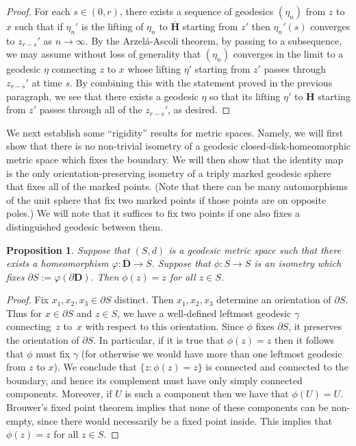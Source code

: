 \documentclass[10pt]{amsart}
\theoremstyle{plain}
\numberwithin{theorem}{section}
\newtheorem{proposition}[theorem]{Proposition}
\theoremstyle{definition}
\newcommand{\D}{\mathbf{D}}
\newcommand{\h}{\mathbf{H}}
\let\ol\overline
\begin{document}
\begin{proof}
For each $s \in (0,r)$, there exists a sequence of geodesics $(\eta_n)$ from $z$ to $x$ such that if $\eta_n'$ is the lifting of $\eta_n$ to $\ol{\h}$ starting from $z'$ then $\eta_n'(s)$ converges to $z_{r-s}'$ as $n \to \infty$. By the Arzelá-Ascoli theorem, by passing to a subsequence, we may assume without loss of generality that $(\eta_n)$ converges in the limit to a geodesic $\eta$ connecting $z$ to $x$ whose lifting $\eta'$ starting from $z'$ passes through $z_{r-s}'$ at time $s$. By combining this with the statement proved in the previous paragraph, we see that there exists a geodesic $\eta$ so that its lifting $\eta'$ to $\ol{\h}$ starting from $z'$ passes through all of the $z_{r-s}'$, as desired.
\end{proof}

We next establish some ``rigidity'' results for metric spaces. Namely, we will first show that there is no non-trivial isometry of a geodesic closed-disk-homeomorphic metric space which fixes the boundary. We will then show that the identity map is the only orientation-preserving isometry of a triply marked geodesic sphere that fixes all of the marked points. (Note that there can be many automorphisms of the unit sphere that fix two marked points if those points are on opposite poles.) We will note that it suffices to fix two points if one also fixes a distinguished geodesic between them.

\begin{proposition}
\label{prop::boundaryfixesisometry}
Suppose that $(S,d)$ is a geodesic metric space such that there exists a homeomorphism $\varphi \colon \ol{\D} \to S$. Suppose that $\phi \colon S \to S$ is an isometry which fixes $\partial S := \varphi(\partial \D)$. Then $\phi(z) = z$ for all $z \in S$.
\end{proposition}
\begin{proof}
Fix $x_1,x_2,x_3 \in \partial S$ distinct. Then $x_1,x_2,x_3$ determine an orientation of $\partial S$. Thus for $x \in \partial S$ and $z \in S$, we have a well-defined leftmost geodesic $\gamma$ connecting~$z$ to~$x$ with respect to this orientation. Since $\phi$ fixes $\partial S$, it preserves the orientation of $\partial S$. In particular, if it is true that $\phi(z) = z$ then it follows that $\phi$ must fix $\gamma$ (for otherwise we would have more than one leftmost geodesic from $z$ to $x$). We conclude that $\{z : \phi(z) = z\}$ is connected and connected to the boundary, and hence its complement must have only simply connected components. Moreover, if $U$ is such a component then we have that $\phi(U) = U$. Brouwer's fixed point theorem implies that none of these components can be non-empty, since there would necessarily be a fixed point inside. This implies that $\phi(z) = z$ for all $z \in S$.
\end{proof}
\end{document}

